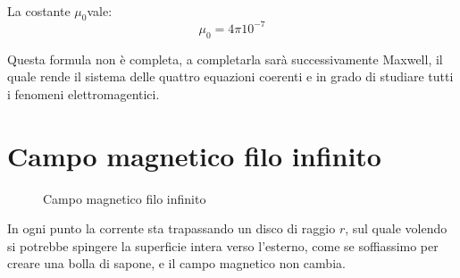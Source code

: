 \paragraph{}
La costante $\mu_0 $vale:
\begin{equation*}
    \mu_0 = 4\pi 10^{-7}
\end{equation*}

Questa formula non è completa, a completarla sarà successivamente Maxwell, il quale rende il sistema delle quattro equazioni coerenti e in grado di studiare tutti i fenomeni elettromagentici.

\section{Campo magnetico filo infinito}
\begin{figure}[H]
    \centering
    \caption{Campo magnetico filo infinito}
    \label{fig:campoEletFiloInf}
\end{figure}

In ogni punto la corrente sta trapassando un disco di raggio $r$, sul quale volendo si potrebbe spingere la superficie intera verso l'esterno, come se soffiassimo per creare una bolla di sapone, e il campo magnetico non cambia.

